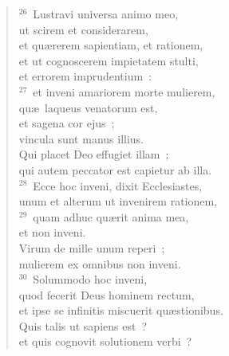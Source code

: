 \begin{verse}${}^{26}$~Lustravi universa animo meo,\\ ut scirem et considerarem,\\ et qu\ae rerem sapientiam, et rationem,\\ et ut cognoscerem impietatem stulti,\\ et errorem imprudentium~:\\
${}^{27}$~et inveni amariorem morte mulierem,\\ qu\ae\ laqueus venatorum est,\\ et sagena cor ejus~;\\ vincula sunt manus illius.\\ Qui placet Deo effugiet illam~;\\ qui autem peccator est capietur ab illa.\\
${}^{28}$~Ecce hoc inveni, dixit Ecclesiastes,\\ unum et alterum ut invenirem rationem,\\
${}^{29}$~quam adhuc qu\ae rit anima mea,\\ et non inveni.\\ Virum de mille unum reperi~;\\ mulierem ex omnibus non inveni.\\
${}^{30}$~Solummodo hoc inveni,\\ quod fecerit Deus hominem rectum,\\ et ipse se infinitis miscuerit qu\ae stionibus.\\ Quis talis ut sapiens est~?\\ et quis cognovit solutionem verbi~?\end{verse}



